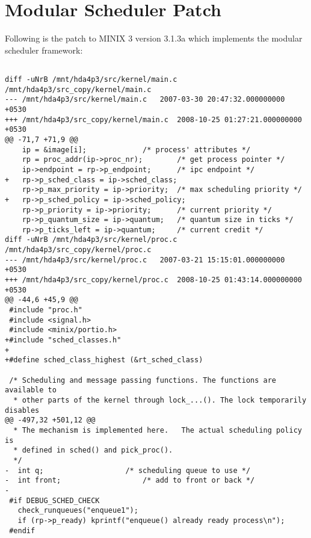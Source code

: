 \chapter{Modular Scheduler Patch}

Following is the patch to MINIX 3 version 3.1.3a which implements the modular scheduler framework:

\tiny
\begin{verbatim}

diff -uNrB /mnt/hda4p3/src/kernel/main.c /mnt/hda4p3/src_copy/kernel/main.c
--- /mnt/hda4p3/src/kernel/main.c	2007-03-30 20:47:32.000000000 +0530
+++ /mnt/hda4p3/src_copy/kernel/main.c	2008-10-25 01:27:21.000000000 +0530
@@ -71,7 +71,9 @@
 	ip = &image[i];				/* process' attributes */
 	rp = proc_addr(ip->proc_nr);		/* get process pointer */
 	ip->endpoint = rp->p_endpoint;		/* ipc endpoint */
+	rp->p_sched_class = ip->sched_class;
 	rp->p_max_priority = ip->priority;	/* max scheduling priority */
+	rp->p_sched_policy = ip->sched_policy;
 	rp->p_priority = ip->priority;		/* current priority */
 	rp->p_quantum_size = ip->quantum;	/* quantum size in ticks */
 	rp->p_ticks_left = ip->quantum;		/* current credit */
diff -uNrB /mnt/hda4p3/src/kernel/proc.c /mnt/hda4p3/src_copy/kernel/proc.c
--- /mnt/hda4p3/src/kernel/proc.c	2007-03-21 15:15:01.000000000 +0530
+++ /mnt/hda4p3/src_copy/kernel/proc.c	2008-10-25 01:43:14.000000000 +0530
@@ -44,6 +45,9 @@
 #include "proc.h"
 #include <signal.h>
 #include <minix/portio.h>
+#include "sched_classes.h"
+
+#define sched_class_highest (&rt_sched_class)
 
 /* Scheduling and message passing functions. The functions are available to 
  * other parts of the kernel through lock_...(). The lock temporarily disables 
@@ -497,32 +501,12 @@
  * The mechanism is implemented here.   The actual scheduling policy is
  * defined in sched() and pick_proc().
  */
-  int q;	 				/* scheduling queue to use */
-  int front;					/* add to front or back */
-
 #if DEBUG_SCHED_CHECK
   check_runqueues("enqueue1");
   if (rp->p_ready) kprintf("enqueue() already ready process\n");
 #endif
 

\end{verbatim}

